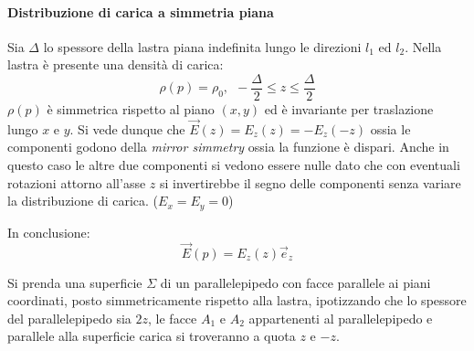 \paragraph{Distribuzione di carica a simmetria piana}
Sia $\Delta$ lo spessore della lastra piana indefinita lungo le direzioni $l_1$ ed $l_2$.
Nella lastra è presente una densità di carica:
$$
\rho(p) = \rho_0, \ \  -\frac{\Delta}{2} \leq z \leq \frac{\Delta}{2}
$$
$\rho(p)$ è simmetrica rispetto al piano $(x,y)$ ed è invariante per traslazione lungo $x$ e $y$.
Si vede dunque che $\vec{E}(z) = E_z(z) = - E_z(-z)$ ossia le componenti godono della 
\textit{mirror simmetry} ossia la funzione è dispari.
Anche in questo caso le altre due componenti si vedono essere nulle dato che con eventuali
rotazioni attorno all'asse $z$ si invertirebbe il segno delle componenti senza variare
la distribuzione di carica. ($E_x=E_y=0$)

In conclusione:
$$
\vec{E}(p) = E_z(z)\vec{e}_z
$$

Si prenda una superficie $\Sigma$ di un parallelepipedo con facce parallele
ai piani coordinati, posto simmetricamente rispetto alla lastra, ipotizzando che lo spessore del 
parallelepipedo sia $2z$, le facce $A_1$ e $A_2$ appartenenti al parallelepipedo e parallele
alla superficie carica si troveranno a quota $z$ e $-z$.

